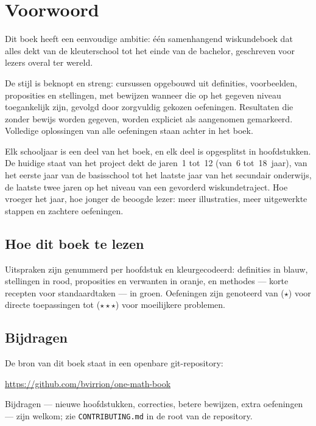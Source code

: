 \chapter{Voorwoord}

Dit boek heeft een eenvoudige ambitie: één samenhangend wiskundeboek dat
alles dekt van de kleuterschool tot het einde van de bachelor, geschreven
voor lezers overal ter wereld.

De stijl is beknopt en streng: cursussen opgebouwd uit definities,
voorbeelden, proposities en stellingen, met bewijzen wanneer die op het
gegeven niveau toegankelijk zijn, gevolgd door zorgvuldig gekozen
oefeningen. Resultaten die zonder bewijs worden gegeven, worden
expliciet als aangenomen gemarkeerd. Volledige oplossingen van alle
oefeningen staan achter in het boek.

Elk schooljaar is een deel van het boek, en elk deel is opgesplitst in
hoofdstukken. De huidige staat van het project dekt de jaren~1 tot~12
(van~6 tot~18~jaar), van het eerste jaar van de basisschool tot het
laatste jaar van het secundair onderwijs, de laatste twee jaren op het
niveau van een gevorderd wiskundetraject. Hoe vroeger het jaar, hoe
jonger de beoogde lezer: meer illustraties, meer uitgewerkte stappen en
zachtere oefeningen.

\section*{Hoe dit boek te lezen}

Uitspraken zijn genummerd per hoofdstuk en kleurgecodeerd: definities in
blauw, stellingen in rood, proposities en verwanten in oranje, en
methodes --- korte recepten voor standaardtaken --- in groen. Oefeningen
zijn genoteerd van ($\star$) voor directe toepassingen tot
($\star\star\star$) voor moeilijkere problemen.

\section*{Bijdragen}

De bron van dit boek staat in een openbare git-repository:
\begin{center}
\url{https://github.com/bvirrion/one-math-book}
\end{center}
Bijdragen --- nieuwe hoofdstukken, correcties, betere bewijzen, extra
oefeningen --- zijn welkom; zie \texttt{CONTRIBUTING.md} in de root van
de repository.
